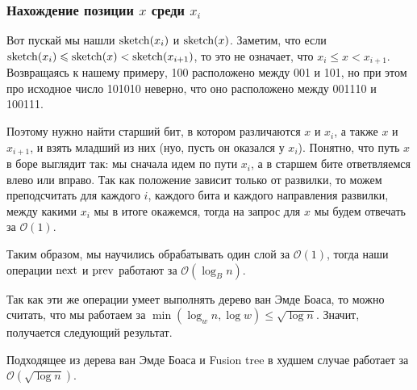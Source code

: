 \subsubsection{Нахождение позиции $x$ среди $x_i$}

Вот пускай мы нашли $\operatorname{sketch}(x_i)$ и $\operatorname{sketch}(x)$. Заметим, что если $\operatorname{sketch}(x_{i}) \leqslant \operatorname{sketch}(x) < \operatorname{sketch}(x_{i+1})$, то это не означает, что $x_i \leqslant x < x_{i+1}$. Возвращаясь к нашему примеру, 100 расположено между 001 и 101, но при этом про исходное число 101010 неверно, что оно расположено между 001110 и 100111.

Поэтому нужно найти старший бит, в котором различаются $x$ и $x_i$, а также $x$ и $x_{i+1}$, и взять младший из них (нуо, пусть он оказался у $x_i$). Понятно, что путь $x$ в боре выглядит так: мы сначала идем по пути $x_i$, а в старшем бите ответвляемся влево или вправо. Так как положение зависит только от развилки, то можем преподсчитать для каждого $i$, каждого бита и каждого направления развилки, между какими $x_i$ мы в итоге окажемся, тогда на запрос для $x$ мы будем отвечать за $\mathcal{O}(1)$.

\bigskip

Таким образом, мы научились обрабатывать один слой за $\mathcal{O}(1)$, тогда наши операции $\operatorname{next}$ и $\operatorname{prev}$ работают за $\mathcal{O}(\log_B n)$.

Так как эти же операции умеет выполнять дерево ван Эмде Боаса, то можно считать, что мы работаем за $\min(\log_w n, \log w)\leqslant\sqrt{\log n}$. Значит, получается следующий результат.

\begin{theorem}
    Подходящее из дерева ван Эмде Боаса и Fusion tree в худшем случае работает за $\mathcal{O}(\sqrt{\log n})$.
\end{theorem}